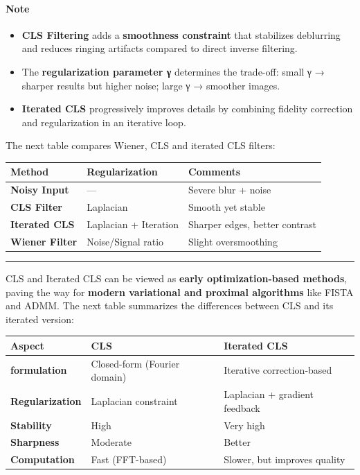 \documentclass[11pt]{article}
\providecommand{\tightlist}{%
      \setlength{\itemsep}{0pt}\setlength{\parskip}{0pt}}
\begin{document}
    \hypertarget{note}{%
\paragraph{\texorpdfstring{\textbf{Note}}{Note}}\label{note}}

\begin{itemize}
\tightlist
\item
  \textbf{CLS Filtering} adds a \textbf{smoothness constraint} that
  stabilizes deblurring and reduces ringing artifacts compared to direct
  inverse filtering.
\item
  The \textbf{regularization parameter γ} determines the trade-off:
  small γ → sharper results but higher noise; large γ → smoother images.
\item
  \textbf{Iterated CLS} progressively improves details by combining
  fidelity correction and regularization in an iterative loop.
\end{itemize}

The next table compares Wiener, CLS and iterated CLS filters:

\begin{longtable}[]{@{}lll@{}}
\toprule
\textbf{Method} & \textbf{Regularization} & \textbf{Comments} \\
\midrule
\endhead
\textbf{Noisy Input} & --- & Severe blur + noise \\
\textbf{CLS Filter} & Laplacian & Smooth yet stable \\
\textbf{Iterated CLS} & Laplacian + Iteration & Sharper edges, better
contrast \\
\textbf{Wiener Filter} & Noise/Signal ratio & Slight oversmoothing \\
\bottomrule
\end{longtable}

\begin{center}\rule{0.5\linewidth}{0.5pt}\end{center}

CLS and Iterated CLS can be viewed as \textbf{early optimization-based
methods}, paving the way for \textbf{modern variational and proximal
algorithms} like FISTA and ADMM. The next table summarizes the
differences between CLS and its iterated version:

\begin{longtable}[]{@{}lll@{}}
\toprule
\textbf{Aspect} & \textbf{CLS} & \textbf{Iterated CLS} \\
\midrule
\endhead
\textbf{formulation} & Closed-form (Fourier domain) & Iterative
correction-based \\
\textbf{Regularization} & Laplacian constraint & Laplacian + gradient
feedback \\
\textbf{Stability} & High & Very high \\
\textbf{Sharpness} & Moderate & Better \\
\textbf{Computation} & Fast (FFT-based) & Slower, but improves
quality \\
\bottomrule
\end{longtable}
\end{document}
